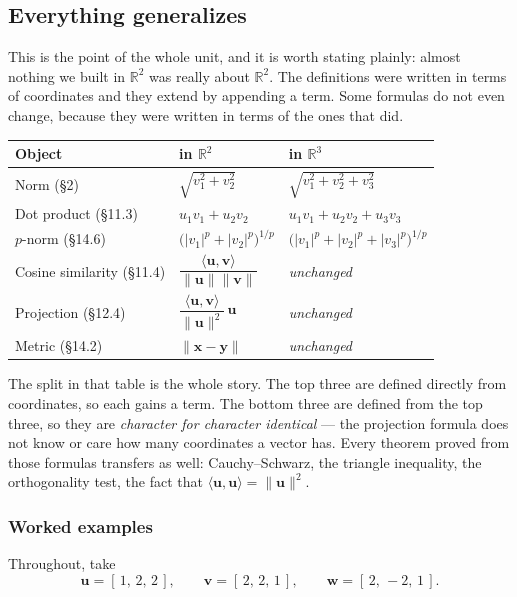 \documentclass[11pt]{article}
\theoremstyle{definition}
\theoremstyle{remark}
\newcommand{\R}{\mathbb{R}}
\newcommand{\vc}[1]{\mathbf{#1}}
\newcommand{\norm}[1]{\lVert #1\rVert}
\begin{document}
\subsection{Everything generalizes}
This is the point of the whole unit, and it is worth stating plainly: almost
nothing we built in $\R^{2}$ was really about $\R^{2}$. The definitions were
written in terms of coordinates and they extend by appending a term. Some
formulas do not even change, because they were written in terms of the ones that
did.

\begin{center}
\renewcommand{\arraystretch}{1.7}
\begin{tabular}{@{}l l l@{}}
\toprule
\textbf{Object} & \textbf{in $\R^{2}$} & \textbf{in $\R^{3}$} \\
\midrule
Norm (\S2)
  & $\sqrt{v_1^{2}+v_2^{2}}$
  & $\sqrt{v_1^{2}+v_2^{2}+v_3^{2}}$ \\
Dot product (\S11.3)
  & $u_1v_1+u_2v_2$
  & $u_1v_1+u_2v_2+u_3v_3$ \\
$p$-norm (\S14.6)
  & $\bigl(\lvert v_1\rvert^{p}+\lvert v_2\rvert^{p}\bigr)^{1/p}$
  & $\bigl(\lvert v_1\rvert^{p}+\lvert v_2\rvert^{p}+\lvert v_3\rvert^{p}\bigr)^{1/p}$ \\
\midrule
Cosine similarity (\S11.4)
  & $\dfrac{\langle\vc{u},\vc{v}\rangle}{\norm{\vc{u}}\norm{\vc{v}}}$
  & \emph{unchanged} \\
Projection (\S12.4)
  & $\dfrac{\langle\vc{u},\vc{v}\rangle}{\norm{\vc{u}}^{2}}\,\vc{u}$
  & \emph{unchanged} \\
Metric (\S14.2)
  & $\norm{\vc{x}-\vc{y}}$
  & \emph{unchanged} \\
\bottomrule
\end{tabular}
\end{center}

\noindent The split in that table is the whole story. The top three are defined
directly from coordinates, so each gains a term. The bottom three are defined
from the top three, so they are \emph{character for character identical} --- the
projection formula does not know or care how many coordinates a vector has.
Every theorem proved from those formulas transfers as well: Cauchy--Schwarz, the
triangle inequality, the orthogonality test, the fact that
$\langle\vc{u},\vc{u}\rangle=\norm{\vc{u}}^{2}$.

\subsubsection*{Worked examples}
Throughout, take
\[
  \vc{u} = [\,1,\,2,\,2\,],
  \qquad
  \vc{v} = [\,2,\,2,\,1\,],
  \qquad
  \vc{w} = [\,2,\,-2,\,1\,] .
\]
\end{document}
